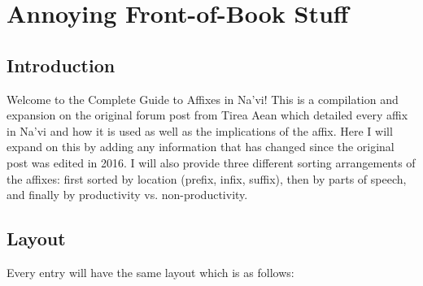 \setcounter{chapter}{-1}
\chapter{Annoying Front-of-Book Stuff}
\section{Introduction}\par

Welcome to the Complete Guide to Affixes in Na'vi!  This is a compilation and expansion on the original forum post from Tirea Aean which detailed every affix in Na'vi and how it is used as well as the implications of the affix.  Here I will expand on this by adding any information that has changed since the original post was edited in 2016.  I will also provide three different sorting arrangements of the affixes: first sorted by location (prefix, infix, suffix), then by parts of speech, and finally by productivity vs. non-productivity.\par

\section{Layout}\par
Every entry will have the same layout which is as follows:

